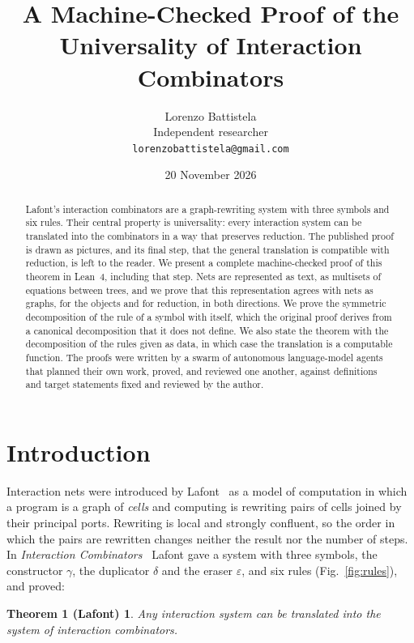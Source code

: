\documentclass[11pt,a4paper]{article}
\title{A Machine-Checked Proof of the Universality of Interaction Combinators}
\author{Lorenzo Battistela\\[0.3em]\small Independent researcher\\
  \small\texttt{lorenzobattistela@gmail.com}}
\date{20 November 2026}
\newtheorem*{lafont}{Theorem 1 (Lafont)}
\begin{document}
\maketitle
\nocite{lafont1997}

\begin{abstract}
\noindent
Lafont's interaction combinators are a graph-rewriting system with three symbols and six rules.
Their central property is universality: every interaction system can be translated into the
combinators in a way that preserves reduction. The published proof is drawn as pictures, and its
final step, that the general translation is compatible with reduction, is left to the reader. We
present a complete machine-checked proof of this theorem in Lean~4, including that step. Nets
are represented as text, as multisets of equations between trees, and we prove that this
representation agrees with nets as graphs, for the objects and for reduction, in both
directions. We prove the symmetric decomposition of the rule of a symbol with itself, which the
original proof derives from a canonical decomposition that it does not define. We also state
the theorem with the decomposition of the rules given as data, in which case the translation is
a computable function. The proofs were written by a swarm of autonomous language-model agents
that planned their own work, proved, and reviewed one another, against definitions and target
statements fixed and reviewed by the author.
\end{abstract}

\section{Introduction}
\label{sec:intro}

Interaction nets were introduced by Lafont~\cite{lafont1990} as a model of computation in which
a program is a graph of \emph{cells} and computing is rewriting pairs of cells joined by their
principal ports. Rewriting is local and strongly confluent, so the order in which the pairs are
rewritten changes neither the result nor the number of steps. In \emph{Interaction
Combinators}~\cite{lafont1997} Lafont gave a system with three symbols, the constructor
$\gamma$, the duplicator $\delta$ and the eraser $\varepsilon$, and six rules
(Fig.~\ref{fig:rules}), and proved:

\begin{lafont}
Any interaction system can be translated into the system of interaction combinators.
\end{lafont}
\end{document}
